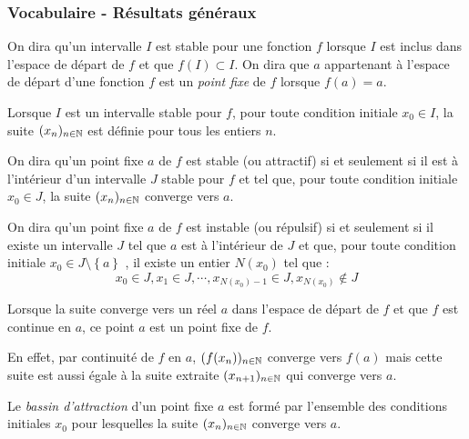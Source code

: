 \subsubsection{Vocabulaire - Résultats généraux}
\begin{defi}
 On dira qu'un intervalle $I$ est stable  pour une fonction $f$ lorsque $I$ est inclus dans l'espace de départ de $f$ et que $f(I)\subset I$.\newline
On dira que $a$ appartenant à l'espace de départ d'une fonction $f$ est un \emph{point fixe} de $f$ lorsque $f(a)=a$.  
\end{defi}
\begin{prop}
 Lorsque $I$ est un intervalle stable pour $f$, pour toute condition initiale $x_0\in I$, la suite $(x_n)_{n\in \mathbb{N}}$ est définie pour tous les entiers $n$.
\end{prop}
\begin{defi}
 On dira qu'un point fixe $a$ de $f$ est stable (ou attractif) si et seulement si il est à l'intérieur d'un intervalle $J$ stable pour $f$ et tel que, pour toute condition initiale $x_0\in J$, la suite $(x_n)_{n\in \mathbb{N}}$ converge vers $a$.
\end{defi}
\begin{defi}
 On dira qu'un point fixe $a$ de $f$ est instable (ou répulsif) si et seulement si il existe un intervalle $J$ tel que $a$ est à l'intérieur de $J$ et que, pour toute condition initiale $x_0\in J \setminus\left\lbrace a\right\rbrace$ , il existe un entier $N(x_0)$ tel que :
\begin{displaymath}
 x_0\in J, x_1\in J, \cdots , x_{N(x_0)-1}\in J, x_{N(x_0)} \not \in J
\end{displaymath}
\end{defi}
\begin{prop}
 Lorsque la suite converge vers un réel $a$ dans l'espace de départ de $f$ et que $f$ est continue en $a$, ce point $a$ est un point fixe de $f$.
\end{prop}
\begin{demo}
 En effet, par continuité de $f$ en $a$, $(f(x_{n}))_{n\in \mathbb{N}}$ converge vers $f(a)$ mais cette suite est aussi égale à la suite extraite $(x_{n+1})_{n\in \mathbb{N}}$ qui converge vers $a$.
\end{demo}
\begin{defi}
Le \emph{bassin d'attraction} d'un point fixe $a$ est formé par l'ensemble des conditions initiales $x_0$ pour lesquelles la suite $(x_{n})_{n\in \mathbb{N}}$ converge vers $a$.
\end{defi}

